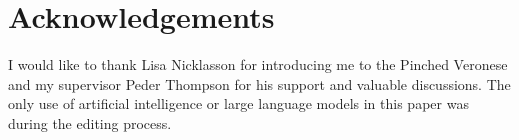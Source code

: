 \section*{Acknowledgements}
\noindent
I would like to thank Lisa Nicklasson for introducing me to the Pinched Veronese and my supervisor Peder Thompson for his support and valuable discussions. 
The only use of artificial intelligence or large language models in this paper was during the editing process.